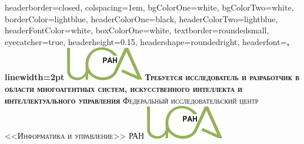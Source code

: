 \documentclass[landscape,a0paper,fontscale=0.285]{baposter} %
\begin{document}
\begin{poster}
{
	headerborder=closed, %
	colspacing=1em, %
	bgColorOne=white, %
	bgColorTwo=white, %
	borderColor=lightblue, %
	headerColorOne=black, %
	headerColorTwo=lightblue, %
	headerFontColor=white, %
	boxColorOne=white, %
	textborder=roundedsmall, %
	eyecatcher=true, %
	headerheight=0.15\textheight, %
	headershape=roundedright, %
	headerfont=\Large\bf\textsc, %
	linewidth=2pt %
}
%
{\includegraphics[height=4em]{isa-frc/isa-logo.png}} 
{\bf\textsc{Требуется исследователь и разработчик в области многоагентных систем, искусственного интеллекта и интеллектуального управления}\vspace{0.5em}} 
{\textsc{Федеральный исследовательский центр <<Информатика и управление>> РАН}} 
{\includegraphics[height=4em]{isa-frc/isa-logo.png}} 

\end{poster}
\end{document}
